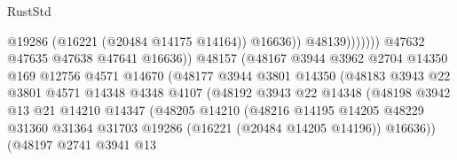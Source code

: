 \begin{lexlean}{RustStd}
\begin{coremodule}
                                                    @19286
                                                    (@16221 (@20484 @14175 @14164))
                                                    @16636))
                                                @48139)))))))
                                  @47632
                                  @47635
                                  @47638
                                  @47641
                                  @16636))
                              @48157
                              (@48167
                                @3944
                                @3962
                                @2704
                                @14350
                                @169
                                @12756
                                @4571
                                @14670
                                (@48177
                                  @3944
                                  @3801
                                  @14350
                                  (@48183
                                    @3943
                                    @22
                                    @3801
                                    @4571
                                    @14348
                                    @4348
                                    @4107
                                    (@48192
                                      @3943
                                      @22
                                      @14348
                                      (@48198
                                        @3942
                                        @13
                                        @21
                                        @14210
                                        @14347
                                        (@48205
                                          @14210
                                          (@48216
                                            @14195
                                            @14205
                                            @48229
                                            @31360
                                            @31364
                                            @31703
                                            @19286
                                            (@16221 (@20484 @14205 @14196))
                                            @16636))
                                        (@48197
                                          @2741
                                          @3941
                                          @13

\end{coremodule}
\end{lexlean}
